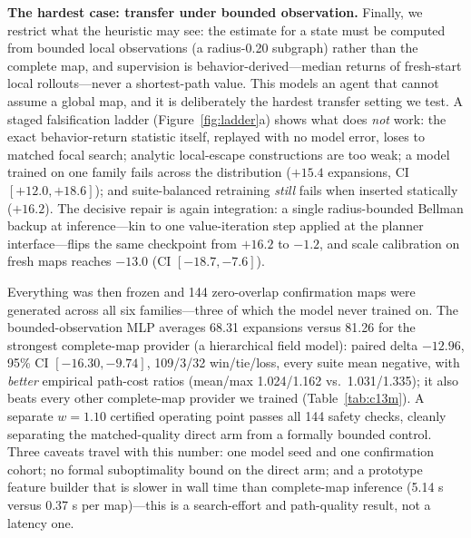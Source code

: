 \documentclass[letterpaper]{article} %
\begin{document}
\textbf{The hardest case: transfer under bounded observation.} Finally, we restrict what the heuristic may see: the estimate for a state must be computed from bounded local observations (a radius-0.20 subgraph) rather than the complete map, and supervision is behavior-derived---median returns of fresh-start local rollouts---never a shortest-path value. This models an agent that cannot assume a global map, and it is deliberately the hardest transfer setting we test. A staged falsification ladder (Figure~\ref{fig:ladder}a) shows what does \emph{not} work: the exact behavior-return statistic itself, replayed with no model error, loses to matched focal search; analytic local-escape constructions are too weak; a model trained on one family fails across the distribution ($+15.4$ expansions, CI $[+12.0,+18.6]$); and suite-balanced retraining \emph{still} fails when inserted statically ($+16.2$). The decisive repair is again integration: a single radius-bounded Bellman backup at inference---kin to one value-iteration step \citep{tamar2016vin} applied at the planner interface---flips the same checkpoint from $+16.2$ to $-1.2$, and scale calibration on fresh maps reaches $-13.0$ (CI $[-18.7,-7.6]$).

Everything was then frozen and 144 zero-overlap confirmation maps were generated across all six families---three of which the model never trained on. The bounded-observation MLP averages 68.31 expansions versus 81.26 for the strongest complete-map provider (a hierarchical field model): paired delta $-12.96$, 95\% CI $[-16.30,-9.74]$, 109/3/32 win/tie/loss, every suite mean negative, with \emph{better} empirical path-cost ratios (mean/max 1.024/1.162 vs.\ 1.031/1.335); it also beats every other complete-map provider we trained (Table~\ref{tab:c13m}). A separate $w{=}1.10$ certified operating point passes all 144 safety checks, cleanly separating the matched-quality direct arm from a formally bounded control. Three caveats travel with this number: one model seed and one confirmation cohort; no formal suboptimality bound on the direct arm; and a prototype feature builder that is slower in wall time than complete-map inference (5.14 s versus 0.37 s per map)---this is a search-effort and path-quality result, not a latency one.
\end{document}
